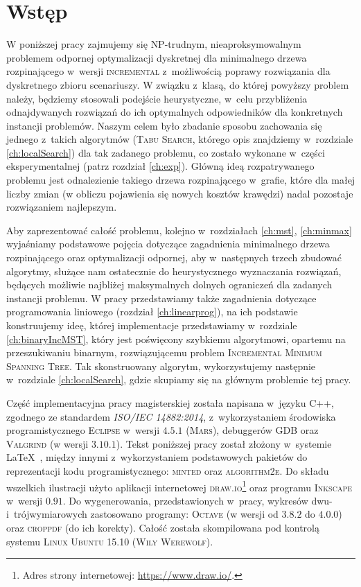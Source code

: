 \chapter{Wstęp}
\thispagestyle{chapterBeginStyle}

W poniższej pracy zajmujemy się \textsc{NP}-trudnym, nieaproksymowalnym~\cite[twierdzenie $6$]{Kasperski2014} problemem odpornej optymalizacji dyskretnej dla minimalnego drzewa rozpinającego w~wersji \textsc{incremental} z~możliwością poprawy rozwiązania dla dyskretnego zbioru scenariuszy. W związku z~klasą, do której powyższy problem należy, będziemy stosowali podejście heurystyczne, w~celu przybliżenia odnajdywanych rozwiązań do ich optymalnych odpowiedników dla konkretnych instancji problemów. Naszym celem było zbadanie sposobu zachowania się jednego z~takich algorytmów (\textsc{Tabu Search}, którego opis znajdziemy w~rozdziale \ref{ch:localSearch}) dla tak zadanego problemu, co zostało wykonane w~części eksperymentalnej (patrz rozdział \ref{ch:exp}). Główną ideą rozpatrywanego problemu jest odnalezienie takiego drzewa rozpinającego w~grafie, które dla małej liczby zmian (w obliczu pojawienia się nowych kosztów krawędzi) nadal pozostaje rozwiązaniem najlepszym. 

Aby zaprezentować całość problemu, kolejno w~rozdziałach \ref{ch:mst}, \ref{ch:minmax} wyjaśniamy podstawowe pojęcia dotyczące zagadnienia minimalnego drzewa rozpinającego oraz optymalizacji odpornej, aby w~następnych trzech zbudować algorytmy, służące nam ostatecznie do heurystycznego wyznaczania rozwiązań, będących możliwie najbliżej maksymalnych dolnych ograniczeń dla zadanych instancji problemu. W pracy przedstawiamy także zagadnienia dotyczące programowania liniowego (rozdział \ref{ch:linearprog}), na ich podstawie konstruujemy ideę, której implementacje przedstawiamy w~rozdziale \ref{ch:binaryIncMST}, który jest poświęcony szybkiemu algorytmowi, opartemu na przeszukiwaniu binarnym, rozwiązującemu problem \textsc{Incremental Minimum Spanning Tree}. Tak skonstruowany algorytm, wykorzystujemy następnie w~rozdziale \ref{ch:localSearch}, gdzie skupiamy się na głównym problemie tej pracy.

Część implementacyjna pracy magisterskiej została napisana w~języku \textsf{C++}, zgodnego ze standardem \textit{\textsc{ISO/IEC 14882:2014}}, z~wykorzystaniem środowiska programistycznego \textsc{Eclipse} w~wersji \textsc{$4.5.1$} (\textsc{Mars}), debuggerów \textsc{GDB} oraz \textsc{Valgrind} (w wersji \textsc{$3.10.1$}).
Tekst poniższej pracy został złożony w~systemie \LaTeX~, między innymi z~wykorzystaniem podstawowych pakietów do reprezentacji kodu programistycznego: \textsc{minted} oraz \textsc{algorithm2e}.
Do składu wszelkich ilustracji użyto aplikacji internetowej \textsc{draw.io}\footnote{
	Adres strony internetowej: \url{https://www.draw.io/}.
} oraz programu \textsc{Inkscape} w~wersji \textsc{$0.91$}.
Do wygenerowania, przedstawionych w~pracy, wykresów dwu- i~trójwymiarowych zastosowano programy: \textsc{Octave} (w wersji od \textsc{$3.8.2$} do \textsc{$4.0.0$}) oraz \textsc{croppdf} (do ich korekty).
Całość została skompilowana pod kontrolą systemu \textsc{Linux Ubuntu 15.10 (Wily Werewolf)}.